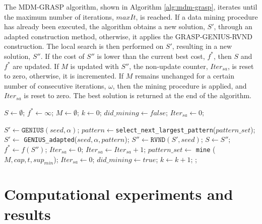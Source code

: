 \documentclass{singlecol-new}
\begin{document}
The MDM-GRASP algorithm, shown in Algorithm \ref{alg:mdm-grasp}, iterates until the maximum number of iterations, $maxIt$, is reached. If a data mining procedure has already been executed, the algorithm obtains a new solution, $S'$, through an adapted construction method, otherwise, it applies the GRASP-GENIUS-RVND construction. The local search is then performed on $S'$, resulting in a new solution, $S''$. If the cost of $S''$ is lower than the current best cost, $f^*$, then $S$ and $f^*$ are updated. If $M$ is updated with $S''$, the non-update counter, $Iter_{sa}$, is reset to zero, otherwise, it is incremented. If $M$ remains unchanged for a certain number of consecutive iterations, $\omega$, then the mining procedure is applied, and $Iter_{sa}$ is reset to zero. The best solution is returned at the end of the algorithm.




\begin{algorithm}[h]
  {\small
	\caption{\hspace{-1mm}: MDM-GRASP($maxIt, seed, t, cap, \alpha, sup_{min}, \omega$)}	
	\label{alg:mdm-grasp}
	\begin{algorithmic}[1]
		
		\STATE $S \gets \emptyset$; $f^* \gets \infty$;  $M \gets \emptyset$; $k \gets 0$; $did\_mining \gets false$; $Iter_{sa} \gets 0$;
		
%		
		
				\STATE $S' \gets \texttt{GENIUS} (seed, \alpha)$; 
			\ELSE
				\STATE $pattern \gets $\texttt{select\_next\_largest\_pattern}($pattern\_set$); 
				\STATE $S' \gets$ \texttt{GENIUS\_adapted}($seed, \alpha, pattern$); 
			\ENDIF
			\STATE $S'' \gets \texttt{RVND} (S', seed)$; 
			\STATE $S \gets S''$; $f^* \gets f(S'')$;
			\ENDIF
				\STATE $Iter_{sa} \gets 0$;
			\ELSE
				\STATE $Iter_{sa} \gets Iter_{sa} + 1$;
			\ENDIF
				\STATE $pattern\_set \gets$ \texttt{mine} ($M,cap,t, sup_{min}$);
				\STATE $Iter_{sa} \gets 0$;
				\STATE $did\_mining\gets true$;
			\ENDIF	
			\STATE $k \gets k + 1$;
		\ENDWHILE
		;
		
	\end{algorithmic}
}
\end{algorithm}


\section{Computational experiments and results}
\end{document}
